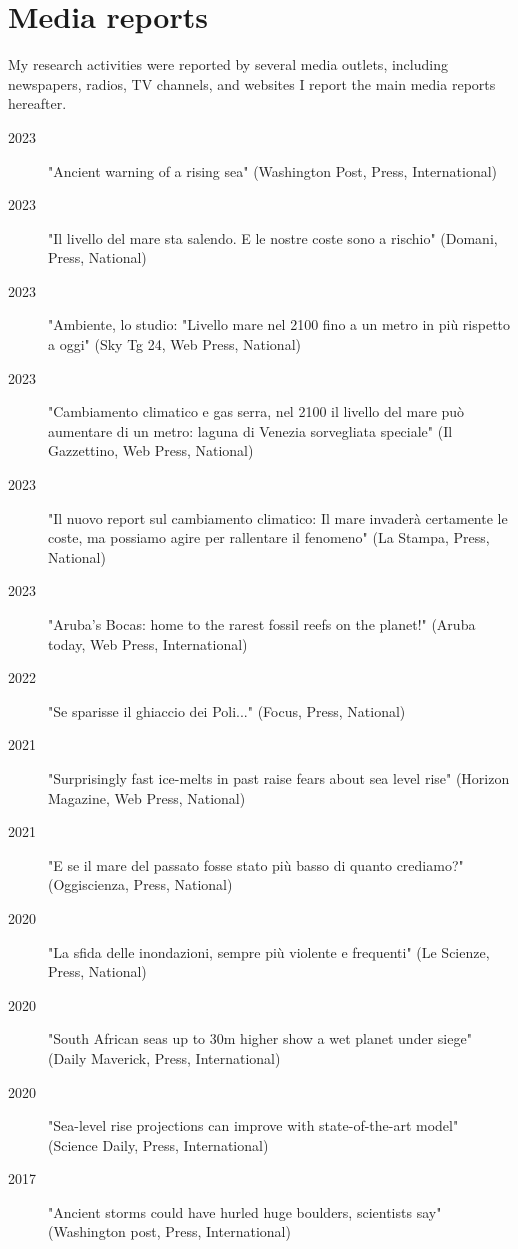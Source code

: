\documentclass[11pt]{article}
\begin{document}
\newpage
\section{Media reports}
{\normalfont My research activities were reported by several media outlets, including newspapers, radios, TV channels, and websites I report the main media reports hereafter.}\\
{\footnotesize 
\begin{description}
  \item [2023] "Ancient warning of a rising sea" (Washington Post, Press, International)
  \item [2023] "Il livello del mare sta salendo. E le nostre coste sono a rischio" (Domani, Press, National) 
  \item [2023] "Ambiente, lo studio: "Livello mare nel 2100 fino a un metro in più rispetto a oggi" (Sky Tg 24, Web Press, National) 
   \item [2023] "Cambiamento climatico e gas serra, nel 2100 il livello del mare può aumentare di un metro: laguna di Venezia sorvegliata speciale" (Il Gazzettino, Web Press, National) 
  \item [2023] "Il nuovo report sul cambiamento climatico: Il mare invaderà certamente le coste, ma possiamo agire per rallentare il fenomeno" (La Stampa, Press, National) 
  \item [2023] "Aruba’s Bocas: home to the rarest fossil reefs on the planet!" (Aruba today, Web Press, International) 
  \item [2022] "Se sparisse il ghiaccio dei Poli..." (Focus, Press, National) 
  \item [2021] "Surprisingly fast ice-melts in past raise fears about sea level rise" (Horizon Magazine, Web Press, National) 
  \item [2021] "E se il mare del passato fosse stato più basso di quanto crediamo?" (Oggiscienza, Press, National) 
  \item [2020] "La sfida delle inondazioni, sempre più violente e frequenti" (Le Scienze, Press, National) 
  \item [2020] "South African seas up to 30m higher show a wet planet under siege" (Daily Maverick, Press, International) 
  \item [2020] "Sea-level rise projections can improve with state-of-the-art model" (Science Daily, Press, International) 
  \item [2017] "Ancient storms could have hurled huge boulders, scientists say" (Washington post, Press, International) 

\end{description}}
\end{document}
